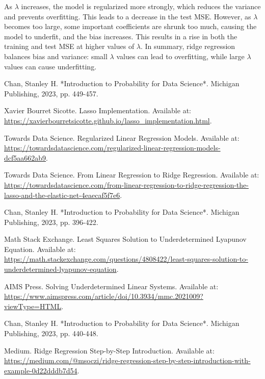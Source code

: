 \documentclass{article}
\begin{document}
As $\lambda$ increases, the model is regularized more strongly, which reduces the variance and prevents overfitting. This leads to a decrease in the test MSE. However, as $\lambda$ becomes too large, some important coefficients are shrunk too much, causing the model to underfit, and the bias increases. This results in a rise in both the training and test MSE at higher values of $\lambda$. In summary, ridge regression balances bias and variance: small $\lambda$ values can lead to overfitting, while large $\lambda$ values can cause underfitting.



\begin{thebibliography}{99}

 Chan, Stanley H. *Introduction to Probability for Data Science*. Michigan Publishing, 2023, pp. 449-457.

 Xavier Bourret Sicotte. Lasso Implementation. Available at: \url{https://xavierbourretsicotte.github.io/lasso_implementation.html}.

 Towards Data Science. Regularized Linear Regression Models. Available at: \url{https://towardsdatascience.com/regularized-linear-regression-models-dcf5aa662ab9}.

 Towards Data Science. From Linear Regression to Ridge Regression. Available at: \url{https://towardsdatascience.com/from-linear-regression-to-ridge-regression-the-lasso-and-the-elastic-net-4eaecaf5f7e6}.

 Chan, Stanley H. *Introduction to Probability for Data Science*. Michigan Publishing, 2023, pp. 396-422.

 Math Stack Exchange. Least Squares Solution to Underdetermined Lyapunov Equation. Available at: \url{https://math.stackexchange.com/questions/4808422/least-squares-solution-to-underdetermined-lyapunov-equation}.

 AIMS Press. Solving Underdetermined Linear Systems. Available at: \url{https://www.aimspress.com/article/doi/10.3934/mmc.2021009?viewType=HTML}.

 Chan, Stanley H. *Introduction to Probability for Data Science*. Michigan Publishing, 2023, pp. 440-448.

 Medium. Ridge Regression Step-by-Step Introduction. Available at: \url{https://medium.com/@msoczi/ridge-regression-step-by-step-introduction-with-example-0d22dddb7d54}.


\end{thebibliography}
\end{document}
